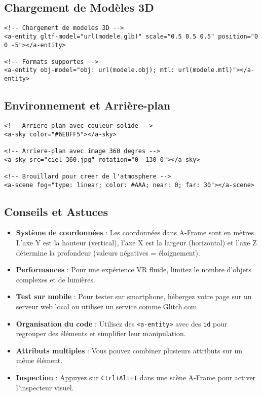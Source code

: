 \documentclass[12pt]{article}
\begin{document}
\subsection{Chargement de Modèles 3D}

\begin{verbatim}
<!-- Chargement de modeles 3D -->
<a-entity gltf-model="url(modele.glb)" scale="0.5 0.5 0.5" position="0 0 -5"></a-entity>

<!-- Formats supportes -->
<a-entity obj-model="obj: url(modele.obj); mtl: url(modele.mtl)"></a-entity>
\end{verbatim}

\subsection{Environnement et Arrière-plan}

\begin{verbatim}
<!-- Arriere-plan avec couleur solide -->
<a-sky color="#6EBFF5"></a-sky>

<!-- Arriere-plan avec image 360 degres -->
<a-sky src="ciel_360.jpg" rotation="0 -130 0"></a-sky>

<!-- Brouillard pour creer de l'atmosphere -->
<a-scene fog="type: linear; color: #AAA; near: 0; far: 30"></a-scene>
\end{verbatim}

\subsection{Conseils et Astuces}

\begin{itemize}
    \item \textbf{Système de coordonnées} : Les coordonnées dans A-Frame sont en mètres. L'axe Y est la hauteur (vertical), l'axe X est la largeur (horizontal) et l'axe Z détermine la profondeur (valeurs négatives = éloignement).
    
    \item \textbf{Performances} : Pour une expérience VR fluide, limitez le nombre d'objets complexes et de lumières.
    
    \item \textbf{Test sur mobile} : Pour tester sur smartphone, hébergez votre page sur un serveur web local ou utilisez un service comme Glitch.com.
    
    \item \textbf{Organisation du code} : Utilisez des \texttt{<a-entity>} avec des \texttt{id} pour regrouper des éléments et simplifier leur manipulation.
    
    \item \textbf{Attributs multiples} : Vous pouvez combiner plusieurs attributs sur un même élément.

    \item \textbf{Inspection} : Appuyez sur \texttt{Ctrl+Alt+I} dans une scène A-Frame pour activer l'inspecteur visuel.
\end{itemize}
\end{document}
